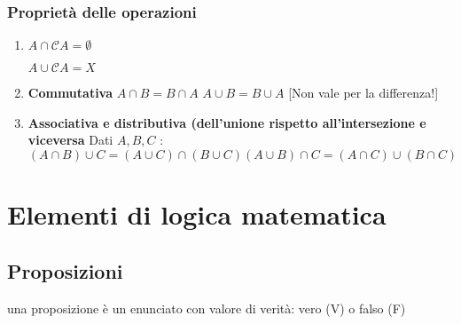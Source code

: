 \documentclass[10pt, oneside]{book}
\theoremstyle{plain}
\begin{document}
\subsection{Proprietà delle operazioni}
\begin{enumerate}
\item \hypertarget{nullo}{$A \cap \mathcal{C}A = \emptyset$}  $A \cup \mathcal{C}A = X$
\item \textbf{Commutativa} $A \cap B = B \cap A$  $A \cup B = B \cup A$ [Non vale per la differenza!]
\item \textbf{Associativa e distributiva (dell'unione rispetto all'intersezione e viceversa} Dati $A, B, C$ : \[(A \cap B) \cup C = (A \cup C) \cap (B \cup C) {   } (A \cup B) \cap C = (A \cap C) \cup (B \cap C)\]
\end{enumerate}
\chapter{Elementi di logica matematica}
\section*{Proposizioni}
\begin{defin}una proposizione è un enunciato con valore di verità: vero (V) o falso (F)
\end{defin}
\end{document}
